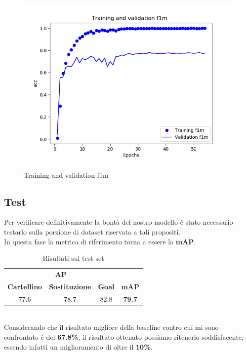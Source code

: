 \begin{figure}[H]
\centering
\caption{Training and validation f1m}
\includegraphics[width=\linewidth]{img/training-validation-f1m.png}
\label{figure : trainingvalf1}
\end{figure}
\subsection{Test}
Per verificare definitivamente la bontà del nostro modello è stato necessario testarlo sulla porzione di dataset riservata a tali propositi. 
\\In questa fase la metrica di riferimento torna a essere la \textbf{mAP}.
\begin{table}[ht]
\label{table: test}
\caption{Risultati sul test set}
\centering
\begin{tabular}{c|c|c||c}
\multicolumn{3}{c}{\textbf{AP}}\\
\textbf{Cartellino} & \textbf{Sostituzione} & \textbf{Goal} & \textbf{mAP} \\
\hline
77.6& 78.7 & 82.8 & \textbf{79.7} \\ [1ex]
\end{tabular}
\end{table}
\\Considerando che il risultato migliore della baseline contro cui mi sono confrontato è del \textbf{67.8\%}, il 
risultato ottenuto possiamo ritenerlo soddisfacente, essendo infatti un miglioramento di oltre il \textbf{10\%}.